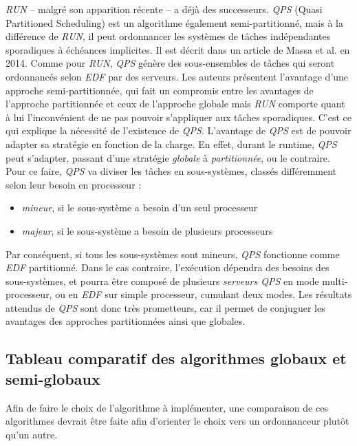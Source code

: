 \documentclass[11pt,a4paper,oneside]{report}
\begin{document}
	\textit{RUN} -- malgré son apparition récente -- a déjà des successeurs. \textit{QPS}
	(Quasi Partitioned Scheduling) est un algorithme 
	également semi-partitionné, mais à la différence de \textit{RUN}, il peut ordonnancer les systèmes de tâches indépendantes sporadiques à échéances implicites. 
	Il est décrit dans un article de Massa et al. \cite{massa_outstanding_2014} en 2014. 
	Comme pour \textit{RUN}, \textit{QPS} génère des sous-ensembles de tâches qui seront ordonnancés 
	selon \textit{EDF} par des serveurs. Les auteurs présentent l'avantage d'une approche semi-partitionnée, 
	qui fait un compromis entre les avantages de l'approche partitionnée et ceux de l'approche globale 
	mais \textit{RUN} comporte quant à lui l'inconvénient de ne pas pouvoir s'appliquer aux tâches sporadiques. C'est ce qui explique la nécessité de l'existence de \textit{QPS}.
	L'avantage de \textit{QPS} est de pouvoir adapter sa stratégie en fonction de la
	charge. En effet, durant le runtime, \textit{QPS} peut s'adapter, passant d'une
	stratégie \textit{globale} à \textit{partitionnée}, ou le contraire. 
	Pour ce faire, \textit{QPS} va diviser les tâches en sous-systèmes, classés différemment selon leur besoin en processeur :\medskip
	\begin{itemize}
		\item \textit{mineur}, si le sous-système a besoin d'un seul processeur
		\item \textit{majeur}, si le sous-système a besoin de plusieurs processeurs
	\end{itemize}
	Par conséquent, si tous les sous-systèmes sont mineurs, \textit{QPS} fonctionne comme 
	\textit{EDF} partitionné. Dans le cas contraire, l'exécution dépendra des besoins 
	des sous-systèmes, et pourra être composé de plusieurs \textit{serveurs QPS} 
	en mode multi-processeur, ou en \textit{EDF} sur simple processeur, cumulant 
	deux modes. \medskip
	Les résultats attendus de \textit{QPS} sont donc très prometteurs, car il permet de 
	conjuguer les avantages des approches partitionnées ainsi que globales.
	
	\subsection{Tableau comparatif des algorithmes globaux et semi-globaux}
	Afin de faire le choix de l'algorithme à implémenter, une comparaison de ces algorithmes 
	devrait être faite afin d'orienter le choix vers un ordonnanceur plutôt qu'un autre. 
	
	\vspace{1em}
	
\end{document}
